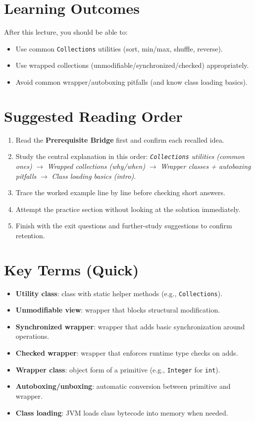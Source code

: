 \documentclass[11pt]{article}
\begin{document}
\section{Learning Outcomes}
After this lecture, you should be able to:
\begin{itemize}
  \item Use common \texttt{Collections} utilities (sort, min/max, shuffle, reverse).
  \item Use wrapped collections (unmodifiable/synchronized/checked) appropriately.
  \item Avoid common wrapper/autoboxing pitfalls (and know class loading basics).
\end{itemize}

\section{Suggested Reading Order}
\begin{enumerate}
  \item Read the \textbf{Prerequisite Bridge} first and confirm each recalled idea.
  \item Study the central explanation in this order: \textit{\texttt{Collections} utilities (common ones)} $\rightarrow$ \textit{Wrapped collections (why/when)} $\rightarrow$ \textit{Wrapper classes + autoboxing pitfalls} $\rightarrow$ \textit{Class loading basics (intro)}.
  \item Trace the worked example line by line before checking short answers.
  \item Attempt the practice section without looking at the solution immediately.
  \item Finish with the exit questions and further-study suggestions to confirm retention.
\end{enumerate}
\notesources{\OOPSUnitVSources}

\section{Key Terms (Quick)}
\begin{itemize}
  \item \textbf{Utility class}: class with static helper methods (e.g., \texttt{Collections}).
  \item \textbf{Unmodifiable view}: wrapper that blocks structural modification.
  \item \textbf{Synchronized wrapper}: wrapper that adds basic synchronization around operations.
  \item \textbf{Checked wrapper}: wrapper that enforces runtime type checks on adds.
  \item \textbf{Wrapper class}: object form of a primitive (e.g., \texttt{Integer} for \texttt{int}).
  \item \textbf{Autoboxing/unboxing}: automatic conversion between primitive and wrapper.
  \item \textbf{Class loading}: JVM loads class bytecode into memory when needed.
\end{itemize}
\end{document}
